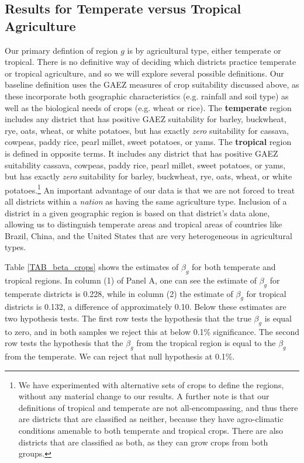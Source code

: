 \documentclass[11pt]{article}
\begin{document}
\subsection{Results for Temperate versus Tropical Agriculture}
Our primary defintion of region $g$ is by agricultural type, either temperate or tropical. There is no definitive way of deciding which districts practice temperate or tropical agriculture, and so we will explore several possible definitions. Our baseline definition uses the GAEZ measures of crop suitability discussed above, as these incorporate both geographic characteristics (e.g. rainfall and soil type) as well as the biological needs of crops (e.g. wheat or rice). The \textbf{temperate} region includes any district that has positive GAEZ suitability for barley, buckwheat, rye, oats, wheat, or white potatoes, but has exactly \textit{zero} suitability for cassava, cowpeas, paddy rice, pearl millet, sweet potatoes, or yams. The \textbf{tropical} region is defined in opposite terms. It includes any district that has positive GAEZ suitability cassava, cowpeas, paddy rice, pearl millet, sweet potatoes, or yams, but has exactly \textit{zero} suitability for barley, buckwheat, rye, oats, wheat, or white potatoes.\footnote{We have experimented with alternative sets of crops to define the regions, without any material change to our results. A further note is that our definitions of tropical and temperate are not all-encompassing, and thus there are districts that are classified as neither, because they have agro-climatic conditions amenable to both temperate and tropical crops. There are also districts that are classified as both, as they can grow crops from both groups.} An important advantage of our data is that we are not forced to treat all districts within a \textit{nation} as having the same agriculture type. Inclusion of a district in a given geographic region is based on that district's data alone, allowing us to distinguish temperate areas and tropical areas of countries like Brazil, China, and the United States that are very heterogeneous in agricultural types.

Table \ref{TAB_beta_crops} shows the estimates of $\beta_g$ for both temperate and tropical regions. In column (1) of Panel A, one can see the estimate of $\beta_g$ for temperate districts is 0.228, while in column (2) the estimate of $\beta_g$ for tropical districts is 0.132, a difference of approximately 0.10. Below these estimates are two hypothesis tests. The first row tests the hypothesis that the true $\beta_g$ is equal to zero, and in both samples we reject this at below 0.1\% significance. The second row tests the hypothesis that the $\beta_g$ from the tropical region is equal to the $\beta_g$ from the temperate. We can reject that null hypothesis at 0.1\%.
\end{document}
